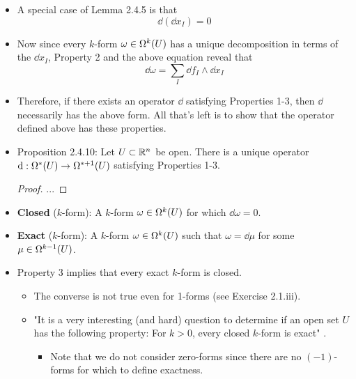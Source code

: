 \documentclass[../notes.tex]{subfiles}
\begin{document}
\begin{itemize}
\begin{proof}
        \begin{align*}
            \dd(\dd f_1\wedge\cdots\wedge\dd f_k) &= \dd(\mu\wedge\dd f_k)\\
            &= \dd\mu\wedge\dd f_k+(-1)^{k-1}\mu\wedge\dd(\dd f_k)\tag*{Property 2}\\
            &= 0
        \end{align*}
        as desired.
    \end{proof}
    \item A special case of Lemma 2.4.5 is that
    \begin{equation*}
        \dd(\dd x_I) = 0
    \end{equation*}
    \item Now since every $k$-form $\omega\in\ome[k]{U}$ has a unique decomposition in terms of the $\dd x_I$, Property 2 and the above equation reveal that
    \begin{equation*}
        \dd\omega = \sum_I\dd f_I\wedge\dd x_I
    \end{equation*}
    \item Therefore, if there exists an operator $\dd$ satisfying Properties 1-3, then $\dd$ necessarily has the above form. All that's left is to show that the operator defined above has these properties.
    \item Proposition 2.4.10: Let $U\subset\R^n$ be open. There is a unique operator $\dd:\ome[*]{U}\to\ome[*+1]{U}$ satisfying Properties 1-3.
    \begin{proof}
        ...
    \end{proof}
    \item \textbf{Closed} ($k$-form): A $k$-form $\omega\in\ome[k]{U}$ for which $\dd\omega=0$.
    \item \textbf{Exact} ($k$-form): A $k$-form $\omega\in\ome[k]{U}$ such that $\omega=\dd\mu$ for some $\mu\in\ome[k-1]{U}$.
    \item Property 3 implies that every exact $k$-form is closed.
    \begin{itemize}
        \item The converse is not true even for 1-forms (see Exercise 2.1.iii).
        \item "It is a very interesting (and hard) question to determine if an open set $U$ has the following property: For $k>0$, every closed $k$-form is exact" \parencite[49]{bib:DifferentialForms}.
        \begin{itemize}
            \item Note that we do not consider zero-forms since there are no $(-1)$-forms for which to define exactness.

\end{itemize}
\end{itemize}
\end{itemize}
\end{document}
